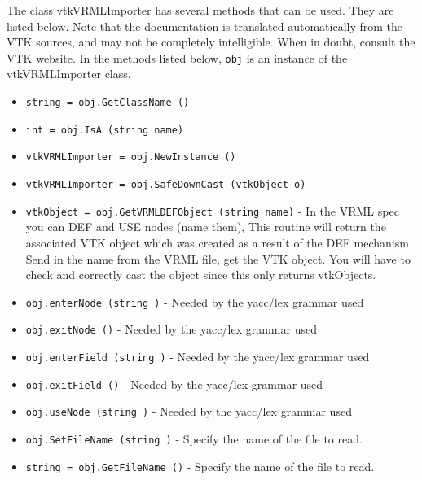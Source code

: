 The class vtkVRMLImporter has several methods that can be used.
  They are listed below.
Note that the documentation is translated automatically from the VTK sources,
and may not be completely intelligible.  When in doubt, consult the VTK website.
In the methods listed below, \verb|obj| is an instance of the vtkVRMLImporter class.
\begin{itemize}
\item  \verb|string = obj.GetClassName ()|

\item  \verb|int = obj.IsA (string name)|

\item  \verb|vtkVRMLImporter = obj.NewInstance ()|

\item  \verb|vtkVRMLImporter = obj.SafeDownCast (vtkObject o)|

\item  \verb|vtkObject = obj.GetVRMLDEFObject (string name)| -  In the VRML spec you can DEF and USE nodes (name them),
 This routine will return the associated VTK object which
 was created as a result of the DEF mechanism
 Send in the name from the VRML file, get the VTK object.
 You will have to check and correctly cast the object since
 this only returns vtkObjects.

\item  \verb|obj.enterNode (string )| -  Needed by the yacc/lex grammar used

\item  \verb|obj.exitNode ()| -  Needed by the yacc/lex grammar used

\item  \verb|obj.enterField (string )| -  Needed by the yacc/lex grammar used

\item  \verb|obj.exitField ()| -  Needed by the yacc/lex grammar used

\item  \verb|obj.useNode (string )| -  Needed by the yacc/lex grammar used

\item  \verb|obj.SetFileName (string )| -  Specify the name of the file to read.

\item  \verb|string = obj.GetFileName ()| -  Specify the name of the file to read.

\end{itemize}
